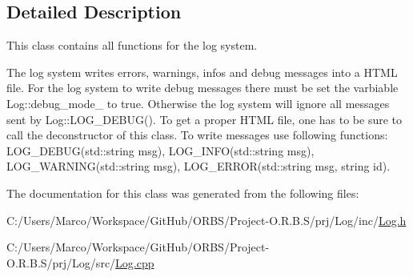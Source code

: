 \subsection{Detailed Description}
This class contains all functions for the log system. 

The log system writes errors, warnings, infos and debug messages into a H\-T\-M\-L file. For the log system to write debug messages there must be set the varbiable Log\-::debug\-\_\-mode\-\_\- to true. Otherwise the log system will ignore all messages sent by Log\-::\-L\-O\-G\-\_\-\-D\-E\-B\-U\-G(). To get a proper H\-T\-M\-L file, one has to be sure to call the deconstructor of this class. To write messages use following functions\-: L\-O\-G\-\_\-\-D\-E\-B\-U\-G(std\-::string msg), L\-O\-G\-\_\-\-I\-N\-F\-O(std\-::string msg), L\-O\-G\-\_\-\-W\-A\-R\-N\-I\-N\-G(std\-::string msg), L\-O\-G\-\_\-\-E\-R\-R\-O\-R(std\-::string msg, string id). 

The documentation for this class was generated from the following files\-:\begin{DoxyCompactItemize}
\item 
C\-:/\-Users/\-Marco/\-Workspace/\-Git\-Hub/\-O\-R\-B\-S/\-Project-\/\-O.\-R.\-B.\-S/prj/\-Log/inc/\hyperlink{_log_8h}{Log.\-h}\item 
C\-:/\-Users/\-Marco/\-Workspace/\-Git\-Hub/\-O\-R\-B\-S/\-Project-\/\-O.\-R.\-B.\-S/prj/\-Log/src/\hyperlink{_log_8cpp}{Log.\-cpp}\end{DoxyCompactItemize}
